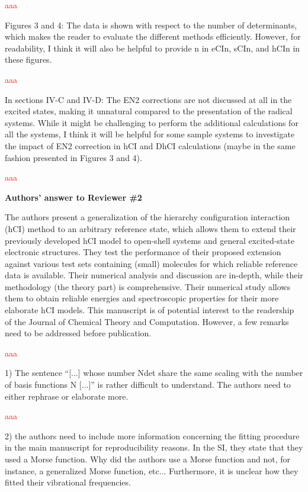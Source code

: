 \documentclass[10pt]{letter}
\newcommand{\alert}[1]{\textcolor{red}{#1}}
\begin{document}
\begin{letter}
\alert{
	aaa
}

{Figures 3 and 4: The data is shown with respect to the number of determinants, which makes the
reader to evaluate the different methods efficiently. However, for readability, I think it will also be
helpful to provide n in eCIn, sCIn, and hCIn in these figures.
}

\alert{
	aaa
}

{In sections IV-C and IV-D: The EN2 corrections are not discussed at all in the excited states, making
it unnatural compared to the presentation of the radical systems. While it might be challenging to
perform the additional calculations for all the systems, I think it will be helpful for some sample
systems to investigate the impact of EN2 correction in hCI and DhCI calculations (maybe in the
same fashion presented in Figures 3 and 4).
}

\alert{
	aaa
}


\clearpage


\noindent \textbf{\large Authors' answer to Reviewer \#2}

{The authors present a generalization of the hierarchy configuration interaction (hCI) method to an arbitrary reference state, which allows them to extend their previously developed hCI model to open-shell systems and general excited-state electronic structures. They test the performance of their proposed extension against various test sets containing (small) molecules for which reliable reference data is available. Their numerical analysis and discussion are in-depth, while their methodology (the theory part) is comprehensive. Their numerical study allows them to obtain reliable energies and spectroscopic properties for their more elaborate hCI models. This manuscript is of potential interest to the readership of the Journal of Chemical Theory and Computation. However, a few remarks need to be addressed before publication.
}

\alert{
aaa
}

{1) The sentence ``[...] whose number Ndet share the same scaling with the number of basis functions N [...]'' is rather difficult to understand. The authors need to either rephrase or elaborate more.
}

\alert{
aaa
}

{2) the authors need to include more information concerning the fitting procedure in the main manuscript for reproducibility reasons. In the SI, they state that they used a Morse function. Why did the authors use a Morse function and not, for instance, a generalized Morse function, etc... Furthermore, it is unclear how they fitted their vibrational frequencies.
}


\end{letter}
\end{document}
